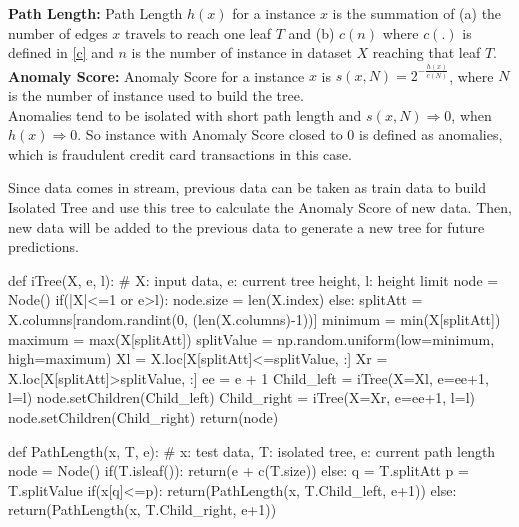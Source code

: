 \documentclass[11pt,a4paper]{article}
\begin{document}
\noindent\textbf{Path Length:} Path Length $h(x)$ for a instance $x$ is the summation of (a) the number of edges $x$ travels to reach one leaf $T$ and 
(b) $c(n)$ where $c(.)$ is defined in \eqref{c} and $n$ is the number of instance in dataset $X$ reaching that leaf $T$.\\

\noindent\textbf{Anomaly Score:} Anomaly Score for a instance $x$ is $s(x, N) = 2^{-\frac{h(x)}{c(N)}}$, where $N$ is the number of instance used to 
build the tree.\\

Anomalies tend to be isolated with short path length and $s(x, N)\Rightarrow 0$, when $h(x)\Rightarrow 0$. So instance with Anomaly 
Score closed to 0 is defined as anomalies, which is fraudulent credit card transactions in this case.
 
Since data comes in stream, previous data can be taken as train data to build Isolated Tree and use this tree to calculate the Anomaly 
Score of new data. Then, new data will be added to the previous data to generate a new tree for future predictions.

\begin{python}
    def iTree(X, e, l): # X: input data, e: current tree height, l: height limit
        node = Node()
        if(|X|<=1 or e>l):
            node.size = len(X.index)
        else:
            splitAtt = X.columns[random.randint(0, (len(X.columns)-1))]
            minimum = min(X[splitAtt])
            maximum = max(X[splitAtt])
            splitValue = np.random.uniform(low=minimum, high=maximum)
            Xl = X.loc[X[splitAtt]<=splitValue, :]
            Xr = X.loc[X[splitAtt]>splitValue, :]
            ee = e + 1
            Child_left = iTree(X=Xl, e=ee+1, l=l)
            node.setChildren(Child_left)
            Child_right = iTree(X=Xr, e=ee+1, l=l)
            node.setChildren(Child_right)
        return(node)

    def PathLength(x, T, e): # x: test data, T: isolated tree, e: current path length
        node = Node()
        if(T.isleaf()):
            return(e + c(T.size))
        else:
            q = T.splitAtt
            p = T.splitValue
            if(x[q]<=p):
                return(PathLength(x, T.Child_left, e+1))
            else:
                return(PathLength(x, T.Child_right, e+1))
\end{python}
\end{document}
